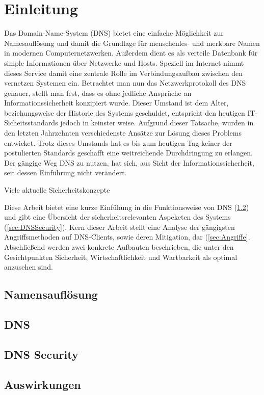 \chapter{Einleitung}
Das Domain-Name-System (DNS) bietet eine einfache Möglichkeit zur Namesauflösung und damit die Grundlage für menschenles- und merkbare Namen in modernen Computernetzwerken. Außerdem dient es als verteile Datenbank für simple Informationen über Netzwerke und Hosts. Speziell im Internet nimmt dieses Service damit eine zentrale Rolle im Verbindungsaufbau zwischen den vernetzen Systemen ein. Betrachtet man nun das Netzwerkprotokoll des DNS genauer, stellt man fest, dass es ohne jedliche Ansprüche an Informationssicherheit konzipiert wurde. Dieser Umstand ist dem Alter, beziehungsweise der Historie des Systems geschuldet, entspricht den heutigen IT-Sicheitsstandards jedoch in keinster weise. Aufgrund dieser Tatsache, wurden in den letzten Jahrzehnten verschiedenste Ansätze zur Lösung dieses Problems entwicket. Trotz dieses Umstands hat es bis zum heutigen Tag keiner der postulierten Standards geschafft eine weitreichende Durchdringung zu erlangen. Der gängige Weg DNS zu nutzen, hat sich, aus Sicht der Informationssicherheit, seit dessen Einführung nicht verändert.

Viele aktuelle Sicherheitskonzepte 

Diese Arbeit bietet eine kurze Einfühung in die Funktionsweise von DNS (\ref{sec:DNS}) und gibt eine Übersicht der sicherheitsrelevanten Aspeketen des Systems (\ref{sec:DNSSecurity}). Kern dieser Arbeit stellt eine Analyse der gängigsten Angriffsmethoden auf DNS-Clients, sowie deren Mitigation, dar (\ref{sec:Angriffe}. Abschließend werden zwei konkrete Aufbauten beschrieben, die unter den Gesichtpunkten Sicherheit, Wirtschaftlichkeit und Wartbarkeit als optimal anzusehen sind. 

\section{Namensauflösung}

\section{DNS}
\label{sec:DNS}
\lipsum


\section{DNS Security}
\lipsum 


\section{Auswirkungen}
\lipsum

% 